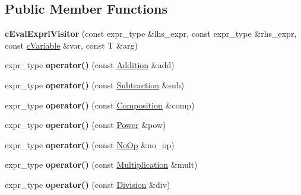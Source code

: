 \subsection*{Public Member Functions}
\begin{DoxyCompactItemize}
\item 
\hypertarget{classcEvalExprlVisitor_a8c5cdfc2e22ac827987d2ce5810e4ce7}{{\bfseries c\-Eval\-Exprl\-Visitor} (const expr\-\_\-type \&lhs\-\_\-expr, const expr\-\_\-type \&rhs\-\_\-expr, const \hyperlink{classcVariable}{c\-Variable} \&var, const T \&arg)}\label{classcEvalExprlVisitor_a8c5cdfc2e22ac827987d2ce5810e4ce7}

\item 
\hypertarget{classcEvalExprlVisitor_aeecac544b22d521ccd6f3914908e805b}{expr\-\_\-type {\bfseries operator()} (const \hyperlink{classAddition}{Addition} \&add)}\label{classcEvalExprlVisitor_aeecac544b22d521ccd6f3914908e805b}

\item 
\hypertarget{classcEvalExprlVisitor_accd72eddf03cc1ea84eb2350c34b8f87}{expr\-\_\-type {\bfseries operator()} (const \hyperlink{classSubtraction}{Subtraction} \&sub)}\label{classcEvalExprlVisitor_accd72eddf03cc1ea84eb2350c34b8f87}

\item 
\hypertarget{classcEvalExprlVisitor_ab5be2e35f71e18468a36a39f08ce0a30}{expr\-\_\-type {\bfseries operator()} (const \hyperlink{classComposition}{Composition} \&comp)}\label{classcEvalExprlVisitor_ab5be2e35f71e18468a36a39f08ce0a30}

\item 
\hypertarget{classcEvalExprlVisitor_a10ec85f7a47b85439fa2f89f065753a7}{expr\-\_\-type {\bfseries operator()} (const \hyperlink{classPower}{Power} \&pow)}\label{classcEvalExprlVisitor_a10ec85f7a47b85439fa2f89f065753a7}

\item 
\hypertarget{classcEvalExprlVisitor_ac842aa9d312290d1e6a2cc26596b74e7}{expr\-\_\-type {\bfseries operator()} (const \hyperlink{structNoOp}{No\-Op} \&no\-\_\-op)}\label{classcEvalExprlVisitor_ac842aa9d312290d1e6a2cc26596b74e7}

\item 
\hypertarget{classcEvalExprlVisitor_abaa457bfde43d0e3020d4388ebf33a30}{expr\-\_\-type {\bfseries operator()} (const \hyperlink{classMultiplication}{Multiplication} \&mult)}\label{classcEvalExprlVisitor_abaa457bfde43d0e3020d4388ebf33a30}

\item 
\hypertarget{classcEvalExprlVisitor_a23625755e5f82f31f4b033883f6840fc}{expr\-\_\-type {\bfseries operator()} (const \hyperlink{classDivision}{Division} \&div)}\label{classcEvalExprlVisitor_a23625755e5f82f31f4b033883f6840fc}

\end{DoxyCompactItemize}
